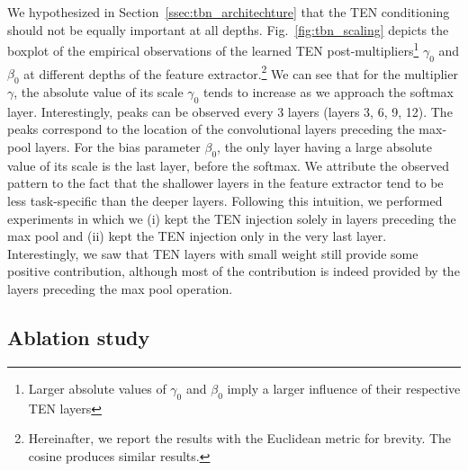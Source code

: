 \documentclass{article}
\begin{document}
We hypothesized in Section~\ref{ssec:tbn_architechture} that the TEN conditioning should not be equally important at all depths. Fig.~\ref{fig:tbn_scaling} depicts the boxplot of the empirical observations of the learned TEN post-multipliers\footnote{Larger absolute values of $\gamma_0$ and $\beta_0$ imply a larger influence of their respective TEN layers} $\gamma_0$ and $\beta_0$ at different depths of the feature extractor.\footnote{Hereinafter, we report the results with the Euclidean metric for brevity. The cosine produces similar results.}  We can see that for the multiplier $\gamma$, the absolute value of its scale $\gamma_0$ tends to increase as we approach the softmax layer. Interestingly, peaks can be observed every 3 layers (layers 3, 6, 9, 12). The peaks correspond to the location of the convolutional layers preceding the max-pool layers. For the bias parameter $\beta_0$, the only layer having a large absolute value of its scale is the last layer, before the softmax. We attribute the observed pattern to the fact that the shallower layers in the feature extractor tend to be less task-specific than the deeper layers. Following this intuition, we performed experiments in which we (i) kept the TEN injection solely in layers preceding the max pool and (ii) kept the TEN injection only in the very last layer. Interestingly, we saw that TEN layers with small weight still provide some positive contribution, although most of the contribution is indeed provided by the layers preceding the max pool operation.


\subsection{Ablation study} \label{ssec:multitask_ablation}
\end{document}
